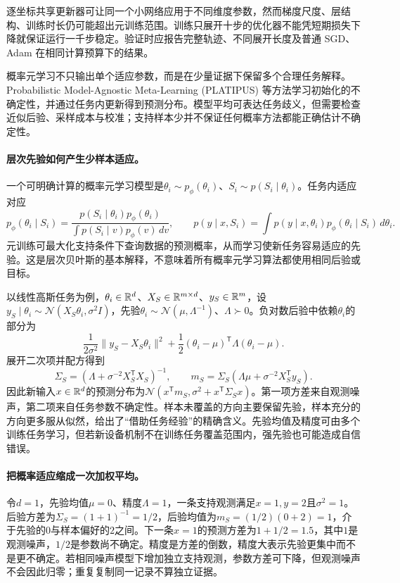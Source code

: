 逐坐标共享更新器可让同一个小网络应用于不同维度参数，然而梯度尺度、层结构、训练时长仍可能超出元训练范围。训练只展开十步的优化器不能凭短期损失下降就保证运行一千步稳定。验证时应报告完整轨迹、不同展开长度及普通 SGD、Adam 在相同计算预算下的结果。

概率元学习不只输出单个适应参数，而是在少量证据下保留多个合理任务解释。Probabilistic Model-Agnostic Meta-Learning (PLATIPUS) 等方法学习初始化的不确定性，并通过任务内更新得到预测分布\cite{finn2018platipus}。模型平均可表达任务歧义，但需要检查近似后验、采样成本与校准；支持样本少并不保证任何概率方法都能正确估计不确定性。

\paragraph{层次先验如何产生少样本适应。}
一个可明确计算的概率元学习模型是$\theta_i\sim p_\phi(\theta_i)$、$S_i\sim p(S_i\mid\theta_i)$。任务内适应对应
\begin{equation}
 p_\phi(\theta_i\mid S_i)
 =\frac{p(S_i\mid\theta_i)p_\phi(\theta_i)}
 {\int p(S_i\mid v)p_\phi(v)\,dv},\qquad
 p(y\mid x,S_i)=\int p(y\mid x,\theta_i)p_\phi(\theta_i\mid S_i)\,d\theta_i.
\end{equation}
元训练可最大化支持条件下查询数据的预测概率，从而学习使新任务容易适应的先验。这是层次贝叶斯的基本解释，不意味着所有概率元学习算法都使用相同后验或目标。

以线性高斯任务为例，$\theta_i\in\mathbb{R}^d$、$X_S\in\mathbb{R}^{m\times d}$、$y_S\in\mathbb{R}^m$，设$y_S\mid\theta_i\sim\mathcal N(X_S\theta_i,\sigma^2I)$，先验$\theta_i\sim\mathcal N(\mu,\Lambda^{-1})$、$\Lambda\succ0$。负对数后验中依赖$\theta_i$的部分为
\begin{equation}
 \frac1{2\sigma^2}\|y_S-X_S\theta_i\|^2
 +\frac12(\theta_i-\mu)^{\mathsf T}\Lambda(\theta_i-\mu).
\end{equation}
展开二次项并配方得到
\begin{equation}
 \Sigma_S=(\Lambda+\sigma^{-2}X_S^{\mathsf T}X_S)^{-1},\qquad
 m_S=\Sigma_S(\Lambda\mu+\sigma^{-2}X_S^{\mathsf T}y_S).
\end{equation}
因此新输入$x\in\mathbb{R}^d$的预测分布为$\mathcal N(x^{\mathsf T}m_S,\sigma^2+x^{\mathsf T}\Sigma_Sx)$。第一项方差来自观测噪声，第二项来自任务参数不确定性。样本未覆盖的方向主要保留先验，样本充分的方向更多服从似然，给出了“借助任务经验”的精确含义。先验均值及精度可由多个训练任务学习，但若新设备机制不在训练任务覆盖范围内，强先验也可能造成自信错误。

\paragraph{把概率适应缩成一次加权平均。}
令$d=1$，先验均值$\mu=0$、精度$\Lambda=1$，一条支持观测满足$x=1,y=2$且$\sigma^2=1$。后验方差为$\Sigma_S=(1+1)^{-1}=1/2$，后验均值为$m_S=(1/2)(0+2)=1$，介于先验的$0$与样本偏好的$2$之间。下一条$x=1$的预测方差为$1+1/2=1.5$，其中$1$是观测噪声，$1/2$是参数尚不确定。精度是方差的倒数，精度大表示先验更集中而不是更不确定。若相同噪声模型下增加独立支持观测，参数方差可下降，但观测噪声不会因此归零；重复复制同一记录不算独立证据。

